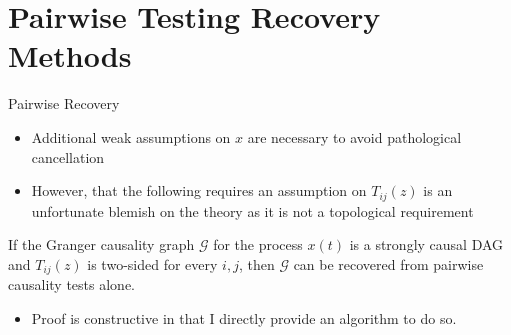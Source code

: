 \documentclass{beamer} %
\def\gcg{\mathcal{G}}  %
\begin{document}
\section{Pairwise Testing Recovery Methods}
\begin{frame}{Pairwise Recovery}
  \begin{itemize}
    \item{Additional weak assumptions on $x$ are necessary to avoid pathological cancellation}\pause
    \item{However, that the following requires an assumption on
        $T_{ij}(z)$ is an unfortunate blemish on the theory as it is
        not a topological requirement}\pause
  \end{itemize}

    \begin{theorem}
      \label{thm:scg_recovery}
      If the Granger causality graph $\gcg$ for the process $x(t)$ is
      a strongly causal DAG and $T_{ij}(z)$ is two-sided for every
      $i, j$, then $\gcg$ can be recovered from pairwise causality
      tests alone.
    \end{theorem}

    \begin{itemize}
      \item{Proof is constructive in that I directly provide an algorithm to do so.}
    \end{itemize}
\end{frame}
\end{document}
